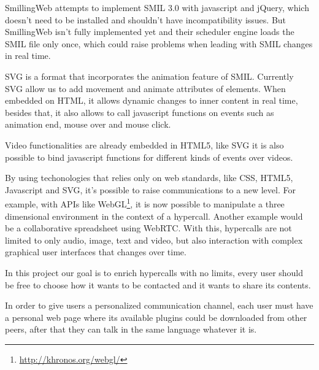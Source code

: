  SmillingWeb \cite{smillingweb} attempts to implement \ac{SMIL} 3.0 with javascript and jQuery, which doesn't need to be installed and shouldn't have incompatibility issues. But SmillingWeb isn't fully implemented yet and their scheduler engine loads the \ac{SMIL} file only once, which could raise problems when leading with \ac{SMIL} changes in real time.  

  \ac{SVG} is a format that incorporates the animation feature of \ac{SMIL}. Currently \ac{SVG} allow us to add movement and animate attributes of elements. When embedded on \ac{HTML}, it allows dynamic changes to inner content in real time, besides that, it also allows to call javascript functions on events such as animation end, mouse over and mouse click.

  Video functionalities are already embedded in \ac{HTML}5, like \ac{SVG} it is also possible to bind javascript functions for different kinds of events over videos.

  By using techonologies that relies only on web standards, like \ac{CSS}, \ac{HTML}5, Javascript and \ac{SVG}, it's possible to raise communications to a new level. For example, with \ac{API}s like WebGL\footnote{\url{http://khronos.org/webgl/}}, it is now possible to manipulate a three dimensional environment in the context of a hypercall. Another example would be a collaborative spreadsheet using WebRTC. With this, hypercalls are not limited to only audio, image, text and video, but also interaction with complex graphical user interfaces that changes over time.

  In this project our goal is to enrich hypercalls with no limits, every user should be free to choose how it wants to be contacted and it wants to share its contents.

  In order to give users a personalized communication channel, each user must have a personal web page where its available plugins could be downloaded from other peers, after that they can talk in the same language whatever it is.